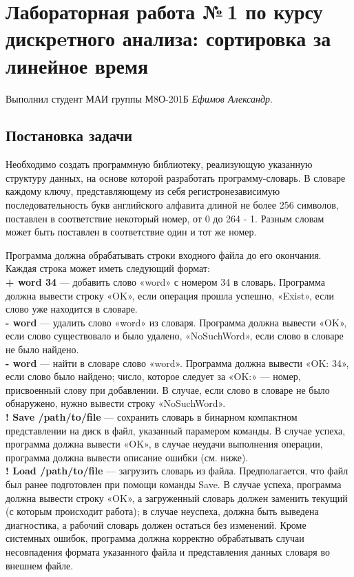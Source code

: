 \documentclass[12pt]{article}
\begin{document}
\section*{Лабораторная работа №\,1 по курсу дискрeтного анализа: сортировка за линейное время}

Выполнил студент МАИ группы М8О-201Б \textit{Ефимов Александр}.

\subsection*{Постановка задачи}


Необходимо создать программную библиотеку, реализующую указанную структуру данных, на основе которой разработать программу-словарь. В словаре каждому ключу, представляющему из себя регистронезависимую последовательность букв английского алфавита длиной не более 256 символов, поставлен в соответствие некоторый номер, от 0 до 264 - 1. Разным словам может быть поставлен в соответствие один и тот же номер.

Программа должна обрабатывать строки входного файла до его окончания. Каждая строка может иметь следующий формат:\\
\textbf{+ word 34} — добавить слово «word» с номером 34 в словарь. Программа должна вывести строку «OK», если операция прошла успешно, «Exist», если слово уже находится в словаре.\\
\textbf{- word} — удалить слово «word» из словаря. Программа должна вывести «OK», если слово существовало и было удалено, «NoSuchWord», если слово в словаре не было найдено.\\
\textbf{- word} — найти в словаре слово «word». Программа должна вывести «OK: 34», если слово было найдено; число, которое следует за «OK:» — номер, присвоенный слову при добавлении. В случае, если слово в словаре не было обнаружено, нужно вывести строку «NoSuchWord».\\
\textbf{! Save /path/to/file} — сохранить словарь в бинарном компактном представлении на диск в файл, указанный парамером команды. В случае успеха, программа должна вывести «OK», в случае неудачи выполнения операции, программа должна вывести описание ошибки (см. ниже).\\
\textbf{! Load /path/to/file} — загрузить словарь из файла. Предполагается, что файл был ранее подготовлен при помощи команды Save. В случае успеха, программа должна вывести строку «OK», а загруженный словарь должен заменить текущий (с которым происходит работа); в случае неуспеха, должна быть выведена диагностика, а рабочий словарь должен остаться без изменений. Кроме системных ошибок, программа должна корректно обрабатывать случаи несовпадения формата указанного файла и представления данных словаря во внешнем файле.
\end{document}
